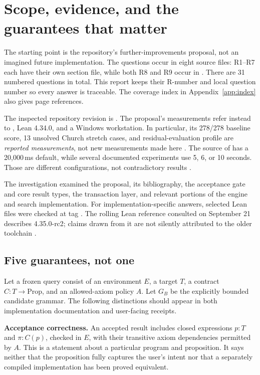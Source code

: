 \section{Scope, evidence, and the guarantees that matter}
\label{sec:foundations}

The starting point is the repository's further-improvements proposal, not an imagined future implementation. The questions occur in eight source files: R1--R7 each have their own section file, while both R8 and R9 occur in . There are 31 numbered questions in total. This report keeps their R-number and local question number so every answer is traceable. The coverage index in Appendix~\ref{app:index} also gives page references.

The inspected repository revision is . The proposal's measurements refer instead to , Lean 4.34.0, and a Windows workstation. In particular, its 278/278 baseline score, 13 unsolved Church stretch cases, and residual-evaluation profile are \emph{reported measurements}, not new measurements made here \cite{proposal}. The source of  has a 20,000\,ms default, while several documented experiments use 5, 6, or 10 seconds. Those are different configurations, not contradictory results \cite{engine}.

The investigation examined the proposal, its bibliography, the acceptance gate and core result types, the transaction layer, and relevant portions of the engine and search implementation. For implementation-specific answers, selected Lean files were checked at tag . The rolling Lean reference consulted on September 21 describes 4.35.0-rc2; claims drawn from it are not silently attributed to the older toolchain \cite{leanreference,leaninduction,leanfuninduction}.

\subsection{Five guarantees, not one}

Let a frozen query consist of an environment $E$, a target $T$, a contract $C:T\to\mathrm{Prop}$, and an allowed-axiom policy $A$. Let $G_B$ be the explicitly bounded candidate grammar. The following distinctions should appear in both implementation documentation and user-facing receipts.

\textbf{Acceptance correctness.} An accepted result includes closed expressions $p:T$ and $\pi:C(p)$, checked in $E$, with their transitive axiom dependencies permitted by $A$. This is a statement about a particular program and proposition. It says neither that the proposition fully captures the user's intent nor that a separately compiled implementation has been proved equivalent.

